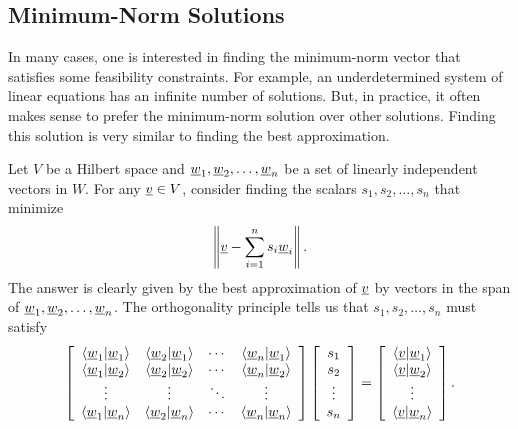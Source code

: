 \subsection{Minimum-Norm Solutions}

In many cases, one is interested in finding the minimum-norm vector that satisfies some feasibility constraints.
For example, an underdetermined system of linear equations has an infinite number of solutions.
But, in practice, it often makes sense to prefer the minimum-norm solution over other solutions.
Finding this solution is very similar to finding the best approximation.

Let $V$ be a Hilbert space and $\underline{w}_1 ,\underline{w}_2 , \ldots, \underline{w}_n$ be a set of linearly independent vectors in $W$.
For any $\underline{v} \in V$, consider finding the scalars $s_1,s_2,\ldots,s_n$ that minimize
\[ \left\| \underline{v} - \sum_{i=1}^n s_i \underline{w}_i \right\|. \]
The answer is clearly given by the best approximation of $\underline{v}$ by vectors in the span of $\underline{w}_1 ,\underline{w}_2 , \ldots, \underline{w}_n$.
The orthogonality principle tells us that $s_1,s_2,\ldots,s_n$ must satisfy
\begin{equation} \label{eqn:DualNormalEquations}
\left[ \begin{array}{cccc}
\left\langle \underline{w}_1 | \underline{w}_1 \right\rangle
& \left\langle \underline{w}_2 | \underline{w}_1 \right\rangle & \cdots
& \left\langle \underline{w}_n | \underline{w}_1 \right\rangle \\
\left\langle \underline{w}_1 | \underline{w}_2 \right\rangle
& \left\langle \underline{w}_2 | \underline{w}_2 \right\rangle & \cdots
& \left\langle \underline{w}_n | \underline{w}_2 \right\rangle \\
\vdots & \vdots & \ddots & \vdots \\
\left\langle \underline{w}_1 | \underline{w}_n \right\rangle
& \left\langle \underline{w}_2 | \underline{w}_n \right\rangle & \cdots
& \left\langle \underline{w}_n | \underline{w}_n \right\rangle
\end{array} \right]
\left[ \begin{array}{c}
s_1 \\ s_2 \\ \vdots \\ s_n \end{array} \right]
= \left[ \begin{array}{c}
\left\langle \underline{v} | \underline{w}_1 \right\rangle \\
\left\langle \underline{v} | \underline{w}_2 \right\rangle \\ \vdots \\
\left\langle \underline{v} | \underline{w}_n \right\rangle \end{array} \right] .
\end{equation}

